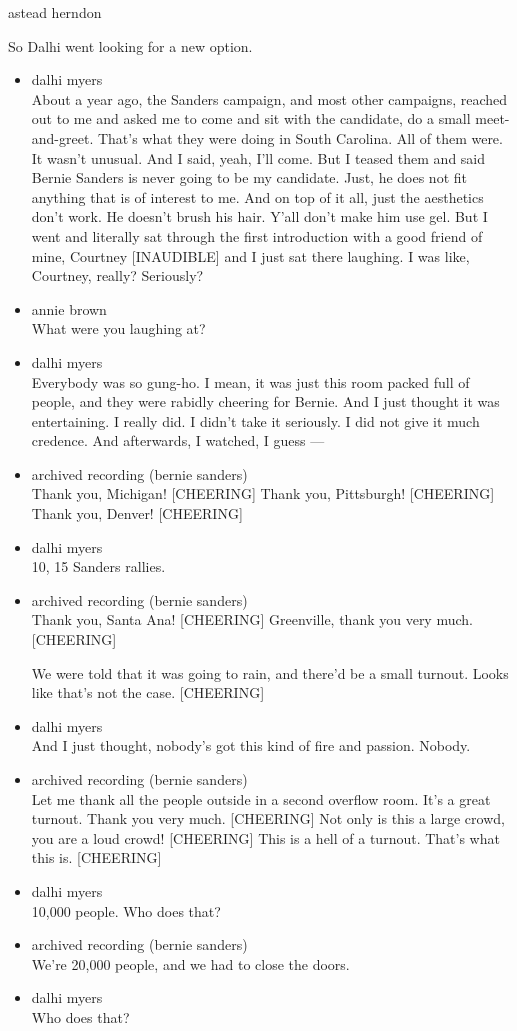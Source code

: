 astead herndon

So Dalhi went looking for a new option.

\begin{itemize}
\item
  dalhi myers\\
  About a year ago, the Sanders campaign, and most other campaigns,
  reached out to me and asked me to come and sit with the candidate, do
  a small meet-and-greet. That's what they were doing in South Carolina.
  All of them were. It wasn't unusual. And I said, yeah, I'll come. But
  I teased them and said Bernie Sanders is never going to be my
  candidate. Just, he does not fit anything that is of interest to me.
  And on top of it all, just the aesthetics don't work. He doesn't brush
  his hair. Y'all don't make him use gel. But I went and literally sat
  through the first introduction with a good friend of mine, Courtney
  {[}INAUDIBLE{]} and I just sat there laughing. I was like, Courtney,
  really? Seriously?
\item
  annie brown\\
  What were you laughing at?
\item
  dalhi myers\\
  Everybody was so gung-ho. I mean, it was just this room packed full of
  people, and they were rabidly cheering for Bernie. And I just thought
  it was entertaining. I really did. I didn't take it seriously. I did
  not give it much credence. And afterwards, I watched, I guess ---
\item
  archived recording (bernie sanders)\\
  Thank you, Michigan! {[}CHEERING{]} Thank you, Pittsburgh!
  {[}CHEERING{]} Thank you, Denver! {[}CHEERING{]}
\item
  dalhi myers\\
  10, 15 Sanders rallies.
\item
  archived recording (bernie sanders)\\
  Thank you, Santa Ana! {[}CHEERING{]} Greenville, thank you very much.
  {[}CHEERING{]}

  We were told that it was going to rain, and there'd be a small
  turnout. Looks like that's not the case. {[}CHEERING{]}
\item
  dalhi myers\\
  And I just thought, nobody's got this kind of fire and passion.
  Nobody.
\item
  archived recording (bernie sanders)\\
  Let me thank all the people outside in a second overflow room. It's a
  great turnout. Thank you very much. {[}CHEERING{]} Not only is this a
  large crowd, you are a loud crowd! {[}CHEERING{]} This is a hell of a
  turnout. That's what this is. {[}CHEERING{]}
\item
  dalhi myers\\
  10,000 people. Who does that?
\item
  archived recording (bernie sanders)\\
  We're 20,000 people, and we had to close the doors.
\item
  dalhi myers\\
  Who does that?
\end{itemize}

